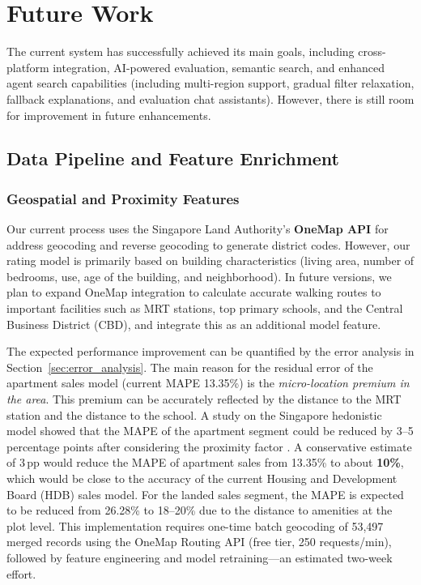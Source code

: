 \chapter{Future Work}

The current system has successfully achieved its main goals, including cross-platform integration, AI-powered evaluation, semantic search, and enhanced agent search capabilities (including multi-region support, gradual filter relaxation, fallback explanations, and evaluation chat assistants). However, there is still room for improvement in future enhancements.

\section{Data Pipeline and Feature Enrichment}

\subsection{Geospatial and Proximity Features}
Our current process uses the Singapore Land Authority's \textbf{OneMap API} for address geocoding and reverse geocoding to generate district codes. However, our rating model is primarily based on building characteristics (living area, number of bedrooms, use, age of the building, and neighborhood). In future versions, we plan to expand OneMap integration to calculate accurate walking routes to important facilities such as MRT stations, top primary schools, and the Central Business District (CBD), and integrate this as an additional model feature.

The expected performance improvement can be quantified by the error analysis in Section~\ref{sec:error_analysis}. The main reason for the residual error of the apartment sales model (current MAPE 13.35\%) is the \textit{micro-location premium in the area}. This premium can be accurately reflected by the distance to the MRT station and the distance to the school. A study on the Singapore hedonistic model showed that the MAPE of the apartment segment could be reduced by 3--5 percentage points after considering the proximity factor \cite{park2015using}. A conservative estimate of 3\,pp would reduce the MAPE of apartment sales from 13.35\% to about \textbf{10\%}, which would be close to the accuracy of the current Housing and Development Board (HDB) sales model. For the landed sales segment, the MAPE is expected to be reduced from 26.28\% to 18--20\% due to the distance to amenities at the plot level. This implementation requires one-time batch geocoding of 53,497 merged records using the OneMap Routing API (free tier, 250 requests/min), followed by feature engineering and model retraining---an estimated two-week effort.

